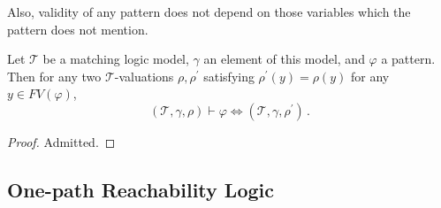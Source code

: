 \documentclass{article}
\begin{document}
Also, validity of any pattern does not depend on those variables which the pattern does not mention.
\begin{lemma}\label{lem:unusedVariables}
    Let $\mathcal{T}$ be a matching logic model, $\gamma$ an element of this model,
    and $\varphi$ a pattern.
    Then for any two $\mathcal{T}$-valuations $\rho,\rho^\prime$
    satisfying $\rho^\prime(y) = \rho(y)$ for any $y \in \mathit{FV}(\varphi)$,
    \begin{equation*}
        (\mathcal{T}, \gamma, \rho) \vdash \varphi \iff (\mathcal{T}, \gamma, \rho^\prime) \, .
    \end{equation*}
\end{lemma}
\begin{proof}
Admitted.
\end{proof}


\subsection{One-path Reachability Logic}
\end{document}
